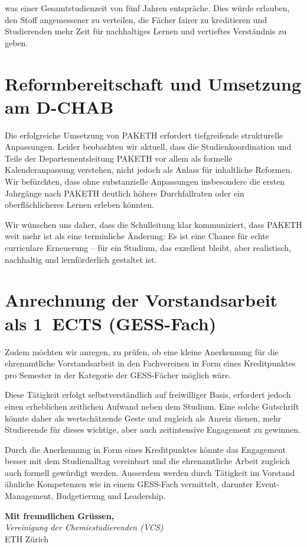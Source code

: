 \documentclass[a4paper]{article}
\begin{document}
was einer Gesamtstudienzeit von fünf Jahren entspräche. Dies würde erlauben, den Stoff angemessener zu verteilen, die Fächer fairer zu kreditieren und Studierenden mehr Zeit für nachhaltiges Lernen und vertieftes Verständnis zu geben.

\section{Reformbereitschaft und Umsetzung am D-CHAB}

Die erfolgreiche Umsetzung von PAKETH erfordert tiefgreifende strukturelle Anpassungen. Leider beobachten wir aktuell, dass die Studienkoordination und Teile der Departementsleitung PAKETH vor allem als formelle Kalenderanpassung verstehen, nicht jedoch als Anlass für inhaltliche Reformen. Wir befürchten, dass ohne substanzielle Anpassungen insbesondere die ersten Jahrgänge nach PAKETH deutlich höhere Durchfallraten oder ein oberflächlicheres Lernen erleben könnten.

Wir wünschen uns daher, dass die Schulleitung klar kommuniziert, dass PAKETH weit mehr ist als eine terminliche Änderung: Es ist eine Chance für echte curriculare Erneuerung – für ein Studium, das exzellent bleibt, aber realistisch, nachhaltig und lernförderlich gestaltet ist.

\section{Anrechnung der Vorstandsarbeit als 1~ECTS (GESS-Fach)}

Zudem möchten wir anregen, zu prüfen, ob eine kleine Anerkennung für die ehrenamtliche Vorstandsarbeit in den Fachvereinen in Form eines Kreditpunktes pro Semester in der Kategorie der GESS-Fächer möglich wäre.

Diese Tätigkeit erfolgt selbstverständlich auf freiwilliger Basis, erfordert jedoch einen erheblichen zeitlichen Aufwand neben dem Studium. Eine solche Gutschrift könnte daher als wertschätzende Geste und zugleich als Anreiz dienen, mehr Studierende für dieses wichtige, aber auch zeitintensive Engagement zu gewinnen.

Durch die Anerkennung in Form eines Kreditpunktes könnte das Engagement besser mit dem Studienalltag vereinbart und die ehrenamtliche Arbeit zugleich auch formell gewürdigt werden. Ausserdem werden durch Tätigkeit im Vorstand ähnliche Kompetenzen wie in einem GESS-Fach vermittelt, darunter Event-Management, Budgetierung und Leadership.

\vspace{2em}

\noindent\textbf{Mit freundlichen Grüssen,}\\[0.5em]
\textit{Vereinigung der Chemiestudierenden (VCS)}\\
ETH Zürich
\end{document}
